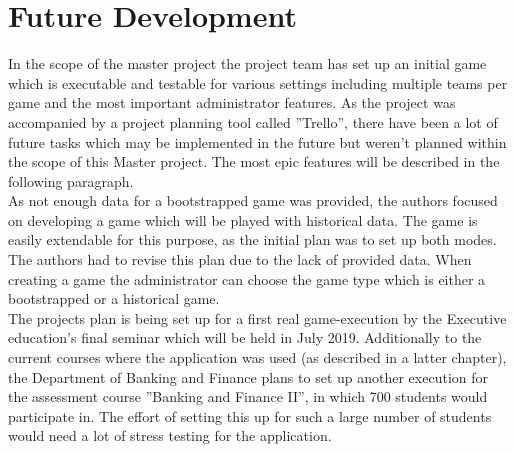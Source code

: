 \section{Future Development}
In the scope of the master project the project team has set up an initial game which is executable and testable for various settings including multiple teams per game and the most important administrator features. As the project was accompanied by a project planning tool called ''Trello'', there have been a lot of future tasks which may be implemented in the future but weren't planned within the scope of this Master project. The most epic features will be described in the following paragraph. \\

As not enough data for a bootstrapped game was provided, the authors focused on developing a game which will be played with historical data. The game is easily extendable for this purpose, as the initial plan was to set up both modes. The authors had to revise this plan due to the lack of provided data. When creating a game the administrator can choose the game type which is either a bootstrapped or a historical game. \\


The projects plan is being set up for a first real game-execution by the Executive education's final seminar which will be held in July 2019. Additionally to the current courses where the application was used (as described in a latter chapter), the Department of Banking and Finance plans to set up another execution for the assessment course ''Banking and Finance II'', in which 700 students would participate in. The effort of setting this up for such a large number of students would need a lot of stress testing for the application.

